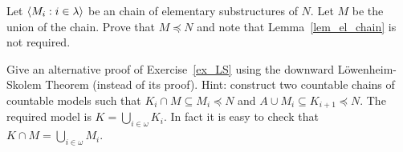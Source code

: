 \begin{exercise}
Let $\langle M_i:i\in\lambda\rangle$ be an chain of elementary substructures of $N$.
Let $M$ be the union of the chain.
Prove that $M\preceq N$ and note that Lemma~\ref{lem_el_chain} is not required.
\end{exercise}


\begin{exercise}
Give an alternative proof of Exercise~\ref{ex_LS} using the downward L\"owenheim-Skolem Theorem (instead of its proof).
Hint: construct two countable chains of countable models such that $K_i\cap M\subseteq M_i\preceq N$ and $A\cup M_i\subseteq K_{i+1}\preceq N$.
The required model is $K=\bigcup_{i\in\omega}K_i$.
In fact it is easy to check that $K\cap M=\bigcup_{i\in\omega}M_i$.
\end{exercise}
